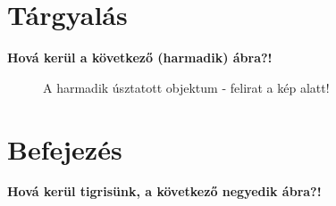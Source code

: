 \documentclass{article}
\begin{document}
\hulipsum[1]

\section{Tárgyalás}

\hulipsum[10-11]

\textbf{Hová kerül a következő (harmadik) ábra?!}

\begin{figure}[h] %
\centering
{}%
\caption{A harmadik úsztatott objektum - felirat a kép alatt!}
\end{figure}

\section{Befejezés}

\hulipsum[3-5]

\textbf{Hová kerül tigrisünk, a következő negyedik ábra?!}
\end{document}
